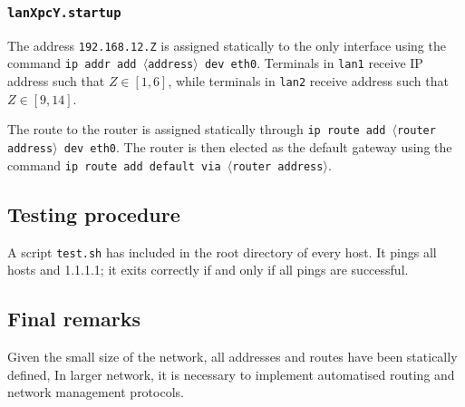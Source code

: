 \documentclass{homework}
\newcommand{\mt}{\texttt}
\begin{document}
    \subsubsection{\mt{lanXpcY.startup}}
    The address \mt{192.168.12.Z} is assigned statically to the only interface using the command \mt{ip addr add $\langle$address$\rangle$ dev eth0}. Terminals in \mt{lan1} receive IP address such that $Z \in \left[1,6\right]$, while terminals in \mt{lan2} receive address such that $Z \in \left[9,14\right]$.
    
    The route to the router is assigned statically through \mt{ip route add $\langle$router address$\rangle$ dev eth0}.
    The router is then elected as the default gateway using the command \mt{ip route add default via $\langle$router address$\rangle$}.
    
    \subsection{Testing procedure}
    A script \mt{test.sh} has included in the root directory of every host. It pings all hosts and 1.1.1.1; it exits correctly if and only if all pings are successful.
    
    \subsection{Final remarks}
    Given the small size of the network, all addresses and routes have been statically defined, In larger network, it is necessary to implement automatised routing and network management protocols.
    
\end{document}
